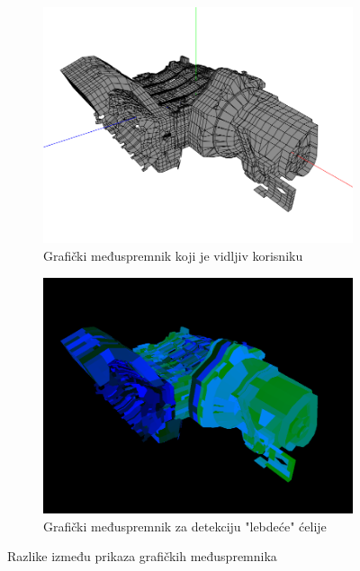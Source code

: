 \documentclass[times, utf8, diplomski]{fer}
\begin{document}
\begin{figure} [H]
     \centering
     \begin{subfigure}[h]{0.8\textwidth}
         \centering
         \includegraphics[width=\textwidth]{engine_default_color.png}
         \caption{Grafički međuspremnik koji je vidljiv korisniku}
         \label{fig:color-settings-normal-mode}
     \end{subfigure}
     \hfill
     \begin{subfigure}[h]{0.8\textwidth}
         \centering
         \includegraphics[width=\textwidth]{engine_cell_selection.png}
         \caption{Grafički međuspremnik za detekciju "lebdeće" ćelije}
         \label{fig:color-settings-limits-mode}
     \end{subfigure}
     \caption{Razlike između prikaza grafičkih međuspremnika}
     \label{fig:framebuffers-example}
\end{figure}
\end{document}
